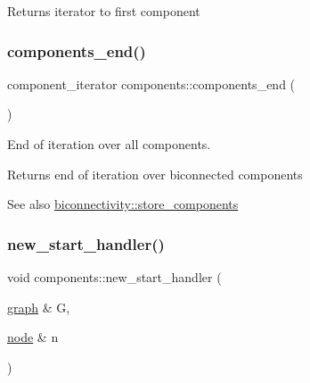 \begin{DoxyReturn}{Returns}
iterator to first component 
\end{DoxyReturn}
\mbox{\label{classcomponents_a8537c6e4c6a29a4ae05a937b5fda1fb9}} 
\subsubsection{\texorpdfstring{components\+\_\+end()}{components\_end()}}
{\footnotesize\ttfamily component\+\_\+iterator components\+::components\+\_\+end (\begin{DoxyParamCaption}{ }\end{DoxyParamCaption})\hspace{0.3cm}{\ttfamily [inline]}}



End of iteration over all components. 

\begin{DoxyReturn}{Returns}
end of iteration over biconnected components 
\end{DoxyReturn}
\begin{DoxySeeAlso}{See also}
\mbox{\hyperlink{classbiconnectivity_a1234e7a70f50fd60c855529fe6fa4acb}{biconnectivity\+::store\+\_\+components}} 
\end{DoxySeeAlso}
\mbox{\label{classcomponents_af53365bd737b34cf63e4a6b10879ffcc}} 
\subsubsection{\texorpdfstring{new\+\_\+start\+\_\+handler()}{new\_start\_handler()}}
{\footnotesize\ttfamily void components\+::new\+\_\+start\+\_\+handler (\begin{DoxyParamCaption}\item[{\mbox{\hyperlink{classgraph}{graph}} \&}]{G,  }\item[{\mbox{\hyperlink{classnode}{node}} \&}]{n }\end{DoxyParamCaption})\hspace{0.3cm}{\ttfamily [virtual]}}



